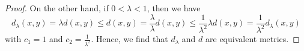 \documentclass[a4paper]{article}
\begin{document}
\begin{problem}
\begin{enumerate}
\begin{proof}
            On the other hand, if \( 0 < \lambda < 1  \), then we have
            \[  {d}_{\lambda}(x,y) = \lambda d(x,y) \leq d(x,y) = \frac{ \lambda }{ \lambda }  d(x,y) \leq \frac{ 1 }{ \lambda^{2} }  \lambda d(x,y) = \frac{ 1 }{ \lambda^{2} }  {d}_{\lambda}(x,y) \]
            with \( {c}_{1} = 1  \) and \( {c}_{2} = \frac{ 1 }{ \lambda^{2} }  \).
            Hence, we find that \( {d}_{\lambda} \) and \( d  \) are equivalent metrics.
            \end{proof}
    \end{enumerate}
\end{problem}
\end{document}
